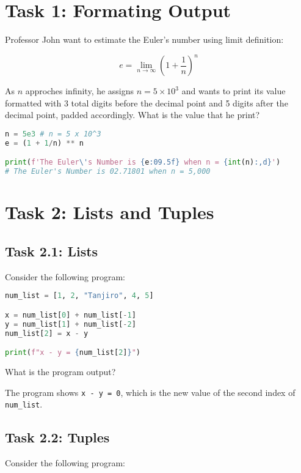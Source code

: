 \documentclass[11pt]{article}
\begin{document}
\section*{Task 1: Formating Output}
Professor John want to estimate the Euler's number using limit definition:

\[ e = \lim_{n \rightarrow \infty} \left(1 + \frac{1}{n} \right) ^ n \]

\noindent
As \(n\) approches infinity, he assigns \(n = 5 \times 10^3\) and wants to print its value formatted with 3 total digits 
before the decimal point and 5 digits after the decimal point, padded accordingly. What is the value that he print?

\begin{lstlisting}[language=Python]
n = 5e3 # n = 5 x 10^3
e = (1 + 1/n) ** n

print(f'The Euler\'s Number is {e:09.5f} when n = {int(n):,d}')
# The Euler's Number is 02.71801 when n = 5,000
\end{lstlisting}

\section*{Task 2: Lists and Tuples}
\subsection*{Task 2.1: Lists}
Consider the following program:

\begin{lstlisting}[language=Python]
num_list = [1, 2, "Tanjiro", 4, 5]

x = num_list[0] + num_list[-1]
y = num_list[1] + num_list[-2]
num_list[2] = x - y

print(f"x - y = {num_list[2]}")
\end{lstlisting}

\noindent
What is the program output?
\begin{tcolorbox}[colback=black!10!white, colframe=black!75!white, title=\textbf{Answer}]
    The program shows \verb|x - y = 0|, which is the new value of the second index of \verb|num_list|.
\end{tcolorbox}    

\clearpage

\subsection*{Task 2.2: Tuples}
Consider the following program:
\end{document}
